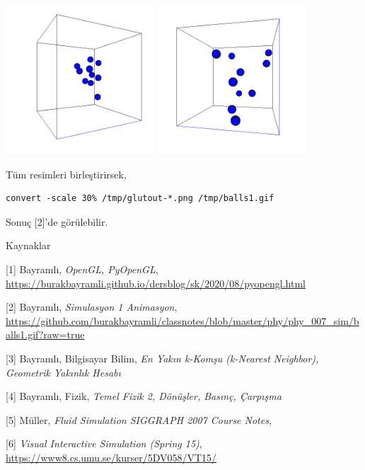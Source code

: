 \documentclass[12pt,fleqn]{article}\usepackage{../../common}
\begin{document}
\includegraphics[width=15em]{glutout-140.png}
\includegraphics[width=15em]{glutout-390.png}

Tüm resimleri birleştirirsek,

\begin{verbatim}
convert -scale 30% /tmp/glutout-*.png /tmp/balls1.gif
\end{verbatim}

Sonuç [2]'de görülebilir.


Kaynaklar

[1] Bayramlı, {\em OpenGL, PyOpenGL}, \url{https://burakbayramli.github.io/dersblog/sk/2020/08/pyopengl.html}

[2] Bayramlı, {\em Simulasyon 1 Animasyon},
    \url{https://github.com/burakbayramli/classnotes/blob/master/phy/phy_007_sim/balls1.gif?raw=true}

[3] Bayramlı, Bilgisayar Bilim, {\em En Yakın k-Komşu (k-Nearest Neighbor), Geometrik Yakınlık Hesabı} 

[4] Bayramlı, Fizik, {\em Temel Fizik 2, Dönüşler, Basınç, Çarpışma}

[5] Müller, {\em Fluid Simulation SIGGRAPH 2007 Course Notes},

[6] {\em Visual Interactive Simulation (Spring 15)},
    \url{https://www8.cs.umu.se/kurser/5DV058/VT15/}
\end{document}
